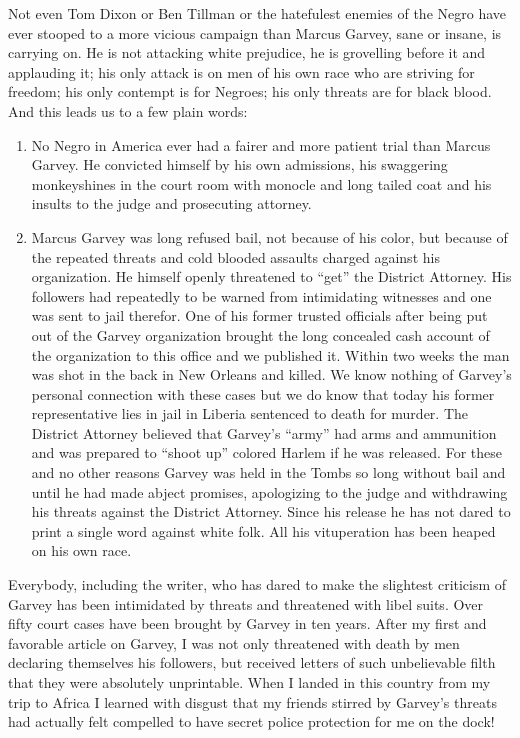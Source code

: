 \documentclass[letterpaper,10pt,english]{jupyterBook}
\begin{document}
\sphinxAtStartPar
Not even Tom Dixon or Ben Tillman or the hatefulest enemies of the Negro have ever stooped to a more vicious campaign than Marcus Garvey, sane or insane, is carrying on. He is not attacking white prejudice, he is grovelling before it and applauding it; his only attack is on men of his own race who are striving for freedom; his only contempt is for Negroes; his only threats are for black blood. And this leads us to a few plain words:
\begin{enumerate}
%
\item {} 
\sphinxAtStartPar
No Negro in America ever had a fairer and more patient trial than Marcus Garvey. He convicted himself by his own admissions, his swaggering monkey\sphinxhyphen{}shines in the court room with monocle and long tailed coat and his insults to the judge and prosecuting attorney.

\item {} 
\sphinxAtStartPar
Marcus Garvey was long refused bail, not because of his color, but because of the repeated threats and cold blooded assaults charged against his organization. He himself openly threatened to “get” the District Attorney. His followers had repeatedly to be warned from intimidating witnesses and one was sent to jail therefor. One of his former trusted officials after being put out of the Garvey organization brought the long concealed cash account of the organization to this office and we published it. Within two weeks the man was shot in the back in New Orleans and killed. We know nothing of Garvey’s personal connection with these cases but we do know that today his former representative lies in jail in Liberia sentenced to death for murder. The District Attorney believed that Garvey’s “army” had arms and ammunition and was prepared to “shoot up” colored Harlem if he was released. For these and no other reasons Garvey was held in the Tombs so long without bail and until he had made abject promises, apologizing to the judge and withdrawing his threats against the District Attorney. Since his release he has not dared to print a single word against white folk. All his vituperation has been heaped on his own race.

\end{enumerate}

\sphinxAtStartPar
Everybody, including the writer, who has dared to make the slightest criticism of Garvey has been intimidated by threats and threatened with libel suits. Over fifty court cases have been brought by Garvey in ten years. After my first and favorable article on Garvey, I was not only threatened with death by men declaring themselves his followers, but received letters of such unbelievable filth that they were absolutely unprintable. When I landed in this country from my trip to Africa I learned with disgust that my friends stirred by Garvey’s threats had actually felt compelled to have secret police protection for me on the dock!
\end{document}
